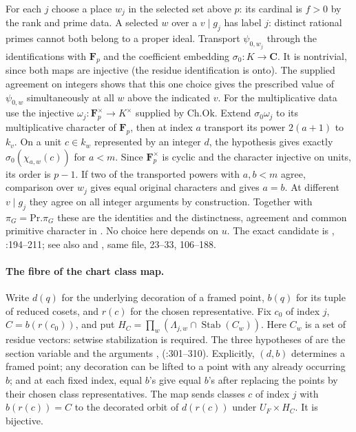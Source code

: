For each $j$ choose a place $w_j$ in the selected set above $p$:
its cardinal is $f>0$ by the rank and prime data. A selected $w$ over a
$v\mid g_j$ has label $j$: distinct rational primes cannot both belong
to a proper ideal. Transport $\psi_{0,w_j}$ through the identifications
with $\mathbf F_p$ and the coefficient embedding $\sigma_0:K\to\mathbf C$.
It is nontrivial, since both maps are injective (the residue identification
is onto). The supplied agreement on integers shows that this one choice
gives the prescribed value of $\psi_{0,w}$ simultaneously at all $w$
above the indicated $v$. For the multiplicative data use the injective
$\omega_j:\mathbf F_p^\times\to K^\times$ supplied by
$\mathrm{Ch.Ok}$. Extend $\sigma_0\omega_j$ to its multiplicative
character of $\mathbf F_p$, then at index $a$ transport its power
$2(a+1)$ to $k_v$. On a unit $c\in k_w$ represented by an integer $d$,
the hypothesis  gives exactly
$\sigma_0(\chi_{a,w}(c))$ for $a<m$. Since $\mathbf F_p^\times$ is
cyclic and the character injective on units, its order is $p-1$.
If two of the transported powers with $a,b<m$ agree, comparison over
$w_j$ gives equal original characters and  gives $a=b$.
At different $v\mid g_j$ they agree on all integer arguments by
construction. Together with $\pi_G=\mathrm{Pr}.\pi_G$ these are the
identities  and the distinctness, agreement and common
primitive character in . No choice here
depends on $u$. The exact candidate is
,
:194--211; see also
 and , same file, 23--33,
106--188.

\paragraph{The fibre of the chart class map.}
Write $d(q)$ for the underlying decoration of a framed point, $b(q)$ for
its tuple of reduced cosets, and $r(c)$ for the chosen representative.
Fix $c_0$ of index $j$, $C=b(r(c_0))$, and put
$H_C=\prod_w (\Lambda_{j,w}\cap\operatorname{Stab}(C_w))$.
Here $C_w$ is a set of residue vectors: setwise stabilization is required.
The three hypotheses of  are the section
variable  and the arguments , 
(:301--310). Explicitly,
$(d,b)$ determines a framed point; any decoration can be lifted to
a point with any already occurring $b$; and at each fixed index, equal
$b$'s give equal $b$'s after replacing the points by their chosen class
representatives. The map sends classes $c$ of index $j$ with
$b(r(c))=C$ to the decorated orbit of $d(r(c))$ under
$U_F\times H_C$. It is bijective.

